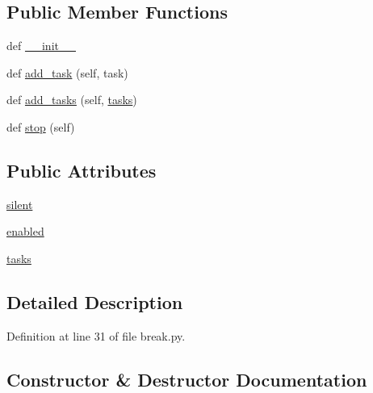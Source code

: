 \subsection*{Public Member Functions}
\begin{DoxyCompactItemize}
\item 
def \hyperlink{classrunner_1_1break_1_1Break_a981c048c85db7c32ac1b6af456fd6220}{\+\_\+\+\_\+init\+\_\+\+\_\+}
\item 
def \hyperlink{classrunner_1_1break_1_1Break_aef9a46f3690c3f0c029cb3b2dc752f17}{add\+\_\+task} (self, task)
\item 
def \hyperlink{classrunner_1_1break_1_1Break_a21381c370a3d561cf9789bb37105029f}{add\+\_\+tasks} (self, \hyperlink{classrunner_1_1break_1_1Break_a58f1c19e0ab172954c3a944a9b8d1b5d}{tasks})
\item 
def \hyperlink{classrunner_1_1break_1_1Break_a86f8753c50874c48268678aba0bf9332}{stop} (self)
\end{DoxyCompactItemize}
\subsection*{Public Attributes}
\begin{DoxyCompactItemize}
\item 
\hyperlink{classrunner_1_1break_1_1Break_a9c73bd0c8672b609bfa868df7b759d15}{silent}
\item 
\hyperlink{classrunner_1_1break_1_1Break_a8076831cad893a375675ef1032454bab}{enabled}
\item 
\hyperlink{classrunner_1_1break_1_1Break_a58f1c19e0ab172954c3a944a9b8d1b5d}{tasks}
\end{DoxyCompactItemize}


\subsection{Detailed Description}


Definition at line 31 of file break.\+py.



\subsection{Constructor \& Destructor Documentation}
\hypertarget{classrunner_1_1break_1_1Break_a981c048c85db7c32ac1b6af456fd6220}{}
